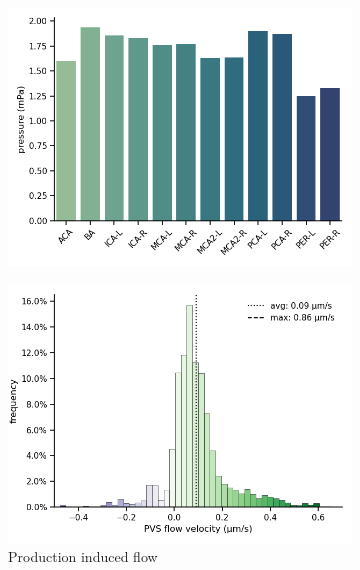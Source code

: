 \documentclass[fleqn,10pt]{wlscirep}
\begin{document}
\begin{figure}
\begin{subfigure}[b]{0.33\textwidth}
    \includegraphics[width =  \linewidth]{figures/sas_flow_arteries_labels_pressure.png}
    \end{subfigure}
         \begin{subfigure}[b]{0.33\textwidth}
    \centering
    \includegraphics[width =  \linewidth]{figures/sas_flow_velocity_histo_cell.png}
    \caption{Production induced flow}
    \end{subfigure}
    \begin{subfigure}[b]{0.33\textwidth}
    \centering

\end{subfigure}
\end{figure}
\end{document}
